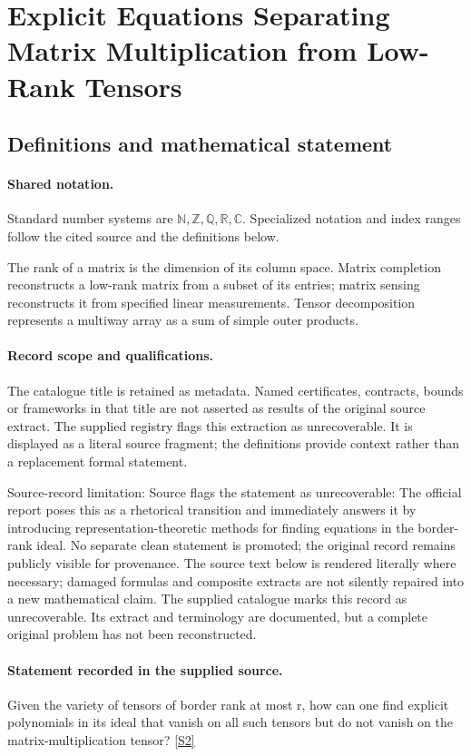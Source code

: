 \documentclass[11pt]{article}
\newcommand{\sref}[2]{\hyperlink{source:#1:#2}{[S#2]}}
\begin{document}
\section{Explicit Equations Separating Matrix Multiplication from Low-Rank Tensors}\label{statement}

\subsection{Definitions and mathematical statement}

\paragraph{Shared notation.}Standard number systems are $\mathbb N,\mathbb Z,\mathbb Q,\mathbb R,\mathbb C$. Specialized notation and index ranges follow the cited source and the definitions below.


The rank of a matrix is the dimension of its column space. Matrix completion reconstructs a low-rank matrix from a subset of its entries; matrix sensing reconstructs it from specified linear measurements. Tensor decomposition represents a multiway array as a sum of simple outer products.
\paragraph{Record scope and qualifications.}
The catalogue title is retained as metadata. Named certificates, contracts, bounds or frameworks in that title are not asserted as results of the original source extract.
The supplied registry flags this extraction as unrecoverable. It is displayed as a literal source fragment; the definitions provide context rather than a replacement formal statement.

Source-record limitation: Source flags the statement as unrecoverable: The official report poses this as a rhetorical transition and immediately answers it by introducing representation-theoretic methods for finding equations in the border-rank ideal. No separate clean statement is promoted; the original record remains publicly visible for provenance.
The source text below is rendered literally where necessary; damaged formulas and composite extracts are not silently repaired into a new mathematical claim.
The supplied catalogue marks this record as unrecoverable. Its extract and terminology are documented, but a complete original problem has not been reconstructed.
\paragraph{Statement recorded in the supplied source.}
Given the variety of tensors of border rank at most r, how can one find explicit polynomials in its ideal that vanish on all such tensors but do not vanish on the matrix-multiplication tensor? \sref{statement}{2}
\end{document}
